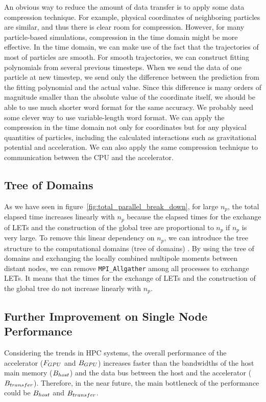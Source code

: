 \documentclass[dvipdfmx]{pasj01}
\begin{document}
An obvious way to reduce the amount of data transfer is to apply some
data compression technique. For example, physical coordinates of
neighboring particles are similar, and thus there is clear room for
compression. However, for many particle-based simulations, compression
in the time domain might be more effective. In the time domain, we can
make use of the fact that the trajectories of most of particles are
smooth. For smooth trajectories, we can construct fitting polynomials
from several previous timesteps. When we send the data of one particle
at new timestep, we send only the difference between the prediction
from the fitting polynomial and the actual value. Since this
difference is many orders of magnitude smaller than the absolute value
of the coordinate itself, we should be able to use much shorter word
format for the same accuracy. We probably need some clever way to use
variable-length word format. We can apply the compression in the time
domain not only for coordinates but for any physical quantities of
particles, including the calculated interactions such as gravitational
potential and acceleration. We can also apply the same compression
technique to communication between the CPU and the accelerator.

\subsection{Tree of Domains}
\label{sec:summary:tree_of_domain}

As we have seen in figure~\ref{fig:total_parallel_break_down}, for
large $n_p$, the total elapsed time increases linearly with $n_{p}$
because the elapsed times for the exchange of LETs and the
construction of the global tree are proportional to $n_{p}$ if $n_p$
is very large. To remove this linear dependency on $n_{p}$, we can
introduce the tree structure to the computational domains (tree of
domains) \citep{Iwasawaetal2018}. By using the tree of domains and
exchanging the locally combined multipole moments between distant
nodes, we can remove {\tt MPI\_Allgather} among all processes to
exchange LETs. It means that the times for the exchange of LETs and
the construction of the global tree do not increase linearly with
$n_p$.

\subsection{Further Improvement on Single Node Performance}

Considering the trends in HPC systems, the overall performance of the
accelerator ($F_{\rm GPU}$ and $B_{\rm GPU}$) increases faster than
the bandwidths of the host main memory ($B_{\rm host}$) and the data
bus between the host and the accelerator ($B_{\rm
  transfer}$). Therefore, in the near future, the main bottleneck of
the performance could be $B_{\rm host}$ and $B_{\rm transfer}$.
\end{document}
